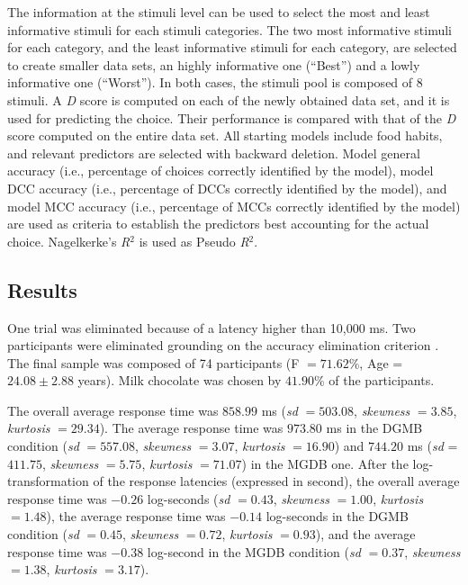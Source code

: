 \documentclass[12pt]{book}
\begin{document}
The information at the stimuli level can be used to select the most and least informative stimuli for each stimuli categories. 
The two most informative stimuli for each category, and the least informative stimuli for each category, are selected to create smaller data sets, an highly informative one (``Best'') and a lowly informative one (``Worst''). 
In both cases, the stimuli pool is composed of 8 stimuli. 
A \emph{D} score is computed on each of the newly obtained data set, and it is used for predicting the choice. Their performance is compared with that of the \emph{D} score computed on the entire data set.
All starting models include food habits, and relevant predictors are selected with backward deletion.
Model general accuracy (i.e., percentage of choices correctly identified by the model), model DCC accuracy (i.e., percentage of DCCs correctly identified by the model), and model MCC accuracy (i.e., percentage of MCCs correctly identified by the model) are used as criteria to establish the predictors best accounting for the actual choice.
Nagelkerke’s \emph{R}$^2$ \cite{nagel} is used as Pseudo \emph{R}$^2$.


\subsection{Results}
One trial was eliminated because of a latency higher than 10,000 ms. Two participants were eliminated grounding on the accuracy elimination criterion \cite{Nosek2002}. The final sample was composed of 74 participants  (F $=71.62$\%, Age = $24.08 \pm2.88$ years). 
Milk chocolate was chosen by $41.90$\% of the participants.

The overall average response time was $858.99$ ms (\emph{sd} $= 503.08$, \emph{skewness} $= 3.85$, \emph{kurtosis} $= 29.34$). The average response time was $973.80$ ms in the DGMB condition (\emph{sd} $= 557.08$, \emph{skewness} $= 3.07$, \emph{kurtosis} $= 16.90$) and $744.20$ ms (\emph{sd} = $411.75$, \emph{skewness} $= 5.75$, \emph{kurtosis} $= 71.07$) in the MGDB one. 
After the log-transformation of the response latencies (expressed in second), the overall average response time was $-0.26$ log-seconds (\emph{sd} $= 0.43$, \emph{skewness} $= 1.00$, \emph{kurtosis} $= 1.48$), the average response time was $-0.14$ log-seconds in the DGMB condition (\emph{sd} $= 0.45$, \emph{skewness} $= 0.72$, \emph{kurtosis} $= 0.93$), and the average response time  was $-0.38$ log-second in the MGDB condition (\emph{sd} $= 0.37$, \emph{skewness} $= 1.38$, \emph{kurtosis} $= 3.17$).
\end{document}
